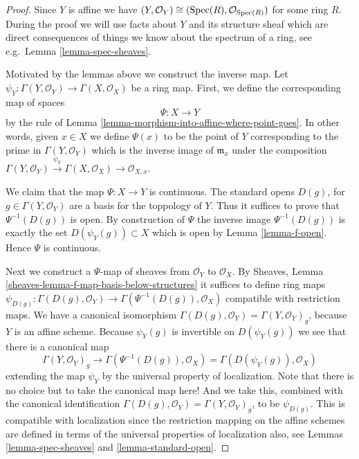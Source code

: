 \begin{proof}
Since $Y$ is affine we have
$(Y, \mathcal{O}_Y) \cong (\mathop{\rm Spec}(R), \mathcal{O}_{\mathop{\rm Spec}(R)})$
for some ring $R$.
During the proof we will use facts about $Y$ and
its structure sheaf which are direct consequences of things
we know about the spectrum of a ring, see e.g.\ Lemma
\ref{lemma-spec-sheaves}.

\medskip\noindent
Motivated by the lemmas above we construct the inverse map.
Let $\psi_Y : \Gamma(Y, \mathcal{O}_Y) \to \Gamma(X, \mathcal{O}_X)$
be a ring map. First, we define the corresponding map of
spaces
$$
\Psi : X \longrightarrow Y
$$
by the rule of
Lemma \ref{lemma-morphism-into-affine-where-point-goes}.
In other words, given $x \in X$ we define $\Psi(x)$
to be the point of $Y$ corresponding to the prime
in $\Gamma(Y, \mathcal{O}_Y)$ which is the inverse
image of $\mathfrak m_x$ under the composition
$
\Gamma(Y, \mathcal{O}_Y) \xrightarrow{\psi_Y}
\Gamma(X, \mathcal{O}_X) \to
\mathcal{O}_{X, x}
$.

\medskip\noindent
We claim that the map $\Psi : X \to Y$ is continuous.
The standard opens $D(g)$, for $g \in \Gamma(Y, \mathcal{O}_Y)$
are a basis for the toppology of $Y$. Thus it suffices to prove
that $\Psi^{-1}(D(g))$ is open. By construction of $\Psi$
the inverse image $\Psi^{-1}(D(g))$ is exactly the set
$D(\psi_Y(g)) \subset X$ which is open by Lemma \ref{lemma-f-open}.
Hence $\Psi$ is continuous.

\medskip\noindent
Next we construct a $\Psi$-map of sheaves from
$\mathcal{O}_Y$ to $\mathcal{O}_X$. By
Sheaves, Lemma \ref{sheaves-lemma-f-map-basis-below-structures}
it suffices to define ring maps
$\psi_{D(g)} : \Gamma(D(g), \mathcal{O}_Y) \to
\Gamma(\Psi^{-1}(D(g)), \mathcal{O}_X)$
compatible with restriction maps.
We have a canonical isomorphism
$\Gamma(D(g), \mathcal{O}_Y) = \Gamma(Y, \mathcal{O}_Y)_g$,
because $Y$ is an affine scheme.
Because $\psi_Y(g)$ is invertible on $D(\psi_Y(g))$
we see that there is a canonical map
$$
\Gamma(Y, \mathcal{O}_Y)_g
\longrightarrow
\Gamma(\Psi^{-1}(D(g)), \mathcal{O}_X)
=
\Gamma(D(\psi_Y(g)), \mathcal{O}_X)
$$
extending the map $\psi_Y$
by the universal property of localization.
Note that there is no choice but to take the canonical map here!
And we take this, combined
with the canonical identification
$\Gamma(D(g), \mathcal{O}_Y) = \Gamma(Y, \mathcal{O}_Y)_g$, to
be $\psi_{D(g)}$. This is compatible with localization since the
restriction mapping on the affine schemes are defined in terms
of the universal properties of localization also, see
Lemmas \ref{lemma-spec-sheaves} and \ref{lemma-standard-open}.


\end{proof}
